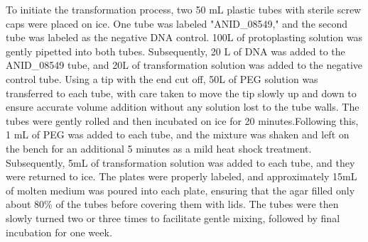 \documentclass[a4paper,10pt]{article}
\begin{document}
\begin{multicols}{2}
To initiate the transformation process, two 50 mL plastic tubes with sterile screw caps were placed on ice. One tube was labeled "ANID\_08549," and the second tube was labeled as the negative DNA control. 100\textmu L of protoplasting solution was gently pipetted into both tubes. Subsequently, 20 \textmu L of DNA was added to the ANID\_08549 tube, and 20\textmu L of transformation solution was added to the negative control tube. Using a tip with the end cut off, 50\textmu L of PEG solution was transferred to each tube, with care taken to move the tip slowly up and down to ensure accurate volume addition without any solution lost to the tube walls. The tubes were gently rolled and then incubated on ice for 20 minutes.Following this, 1 mL of PEG was added to each tube, and the mixture was shaken and left on the bench for an additional 5 minutes as a mild heat shock treatment. Subsequently, 5mL of transformation solution was added to each tube, and they were returned to ice. The plates were properly labeled, and approximately 15mL of molten medium was poured into each plate, ensuring that the agar filled only about 80\% of the tubes before covering them with lids. The tubes were then slowly turned two or three times to facilitate gentle mixing, followed by final incubation for one week.



\end{multicols}
\end{document}
